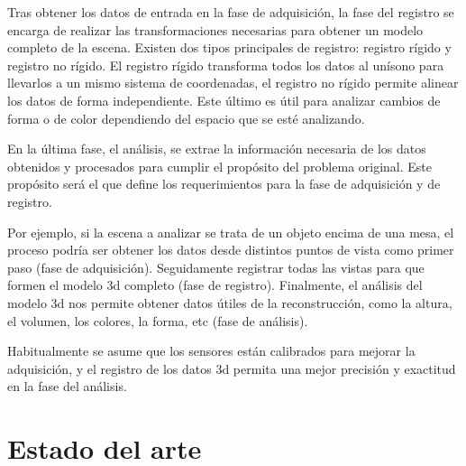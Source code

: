 
Tras obtener los datos de entrada en la fase de adquisición, la fase del registro se encarga de realizar las transformaciones necesarias para obtener un modelo completo de la escena.
Existen dos tipos principales de registro:
registro rígido y registro no rígido.
El registro rígido transforma todos los datos al unísono para llevarlos a un mismo sistema de coordenadas, el registro no rígido permite alinear los datos de forma independiente.
Este último es útil para analizar cambios de forma o de color dependiendo del espacio que se esté analizando.

En la última fase, el análisis, se extrae la información necesaria de los datos obtenidos y procesados para cumplir el propósito del problema original.
Este propósito será el que define los requerimientos para la fase de adquisición y de registro.

Por ejemplo, si la escena a analizar se trata de un objeto encima de una mesa, el proceso podría ser obtener los datos desde distintos puntos de vista como primer paso (fase de adquisición).
Seguidamente registrar todas las vistas para que formen el modelo \gls{3d} completo (fase de registro).
Finalmente, el análisis del modelo \gls{3d} nos permite obtener datos útiles de la reconstrucción, como la altura, el volumen, los colores, la forma, etc (fase de análisis).

Habitualmente se asume que los sensores están calibrados para mejorar la adquisición, y el registro de los datos \gls{3d} permita una mejor precisión y exactitud en la fase del análisis.

\section{Estado del arte}
\label{introduccion-estado-arte}

